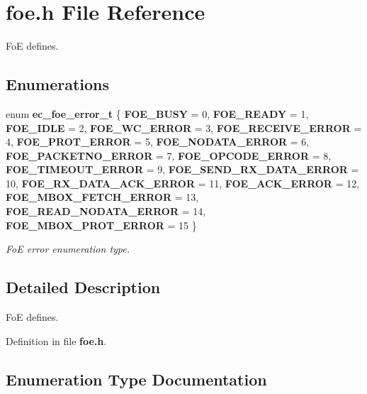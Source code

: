 \section{foe.\-h \-File \-Reference}
\label{foe_8h}


\-Fo\-E defines.  


\subsection*{\-Enumerations}
\begin{DoxyCompactItemize}
\item 
enum {\bf ec\-\_\-foe\-\_\-error\-\_\-t} \{ \*
{\bf \-F\-O\-E\-\_\-\-B\-U\-S\-Y} =  0, 
{\bf \-F\-O\-E\-\_\-\-R\-E\-A\-D\-Y} =  1, 
{\bf \-F\-O\-E\-\_\-\-I\-D\-L\-E} =  2, 
{\bf \-F\-O\-E\-\_\-\-W\-C\-\_\-\-E\-R\-R\-O\-R} =  3, 
\*
{\bf \-F\-O\-E\-\_\-\-R\-E\-C\-E\-I\-V\-E\-\_\-\-E\-R\-R\-O\-R} =  4, 
{\bf \-F\-O\-E\-\_\-\-P\-R\-O\-T\-\_\-\-E\-R\-R\-O\-R} =  5, 
{\bf \-F\-O\-E\-\_\-\-N\-O\-D\-A\-T\-A\-\_\-\-E\-R\-R\-O\-R} =  6, 
{\bf \-F\-O\-E\-\_\-\-P\-A\-C\-K\-E\-T\-N\-O\-\_\-\-E\-R\-R\-O\-R} =  7, 
\*
{\bf \-F\-O\-E\-\_\-\-O\-P\-C\-O\-D\-E\-\_\-\-E\-R\-R\-O\-R} =  8, 
{\bf \-F\-O\-E\-\_\-\-T\-I\-M\-E\-O\-U\-T\-\_\-\-E\-R\-R\-O\-R} =  9, 
{\bf \-F\-O\-E\-\_\-\-S\-E\-N\-D\-\_\-\-R\-X\-\_\-\-D\-A\-T\-A\-\_\-\-E\-R\-R\-O\-R} =  10, 
{\bf \-F\-O\-E\-\_\-\-R\-X\-\_\-\-D\-A\-T\-A\-\_\-\-A\-C\-K\-\_\-\-E\-R\-R\-O\-R} =  11, 
\*
{\bf \-F\-O\-E\-\_\-\-A\-C\-K\-\_\-\-E\-R\-R\-O\-R} =  12, 
{\bf \-F\-O\-E\-\_\-\-M\-B\-O\-X\-\_\-\-F\-E\-T\-C\-H\-\_\-\-E\-R\-R\-O\-R} =  13, 
{\bf \-F\-O\-E\-\_\-\-R\-E\-A\-D\-\_\-\-N\-O\-D\-A\-T\-A\-\_\-\-E\-R\-R\-O\-R} =  14, 
{\bf \-F\-O\-E\-\_\-\-M\-B\-O\-X\-\_\-\-P\-R\-O\-T\-\_\-\-E\-R\-R\-O\-R} =  15
 \}
\begin{DoxyCompactList}\small\item\em \-Fo\-E error enumeration type. \end{DoxyCompactList}\end{DoxyCompactItemize}


\subsection{\-Detailed \-Description}
\-Fo\-E defines. 

\-Definition in file {\bf foe.\-h}.



\subsection{\-Enumeration \-Type \-Documentation}
